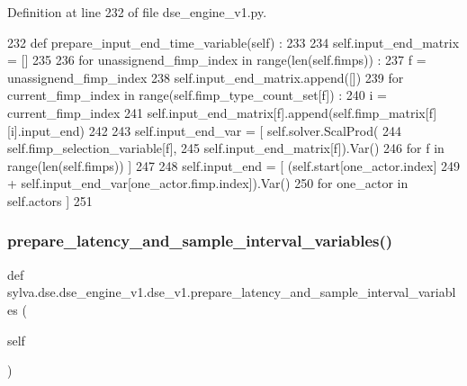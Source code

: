 Definition at line 232 of file dse\+\_\+engine\+\_\+v1.\+py.


\begin{DoxyCode}
232   \textcolor{keyword}{def }prepare\_input\_end\_time\_variable(self) :
233 
234     self.input\_end\_matrix = []
235 
236     \textcolor{keywordflow}{for} unassignend\_fimp\_index \textcolor{keywordflow}{in} range(len(self.fimps)) :
237       f = unassignend\_fimp\_index
238       self.input\_end\_matrix.append([])
239       \textcolor{keywordflow}{for} current\_fimp\_index \textcolor{keywordflow}{in} range(self.fimp\_type\_count\_set[f]) :
240         i = current\_fimp\_index
241         self.input\_end\_matrix[f].append(self.fimp\_matrix[f][i].input\_end)
242 
243     self.input\_end\_var = [ self.solver.ScalProd(
244                              self.fimp\_selection\_variable[f],
245                              self.input\_end\_matrix[f]).Var()
246                       \textcolor{keywordflow}{for} f \textcolor{keywordflow}{in} range(len(self.fimps)) ]
247 
248     self.input\_end = [ (self.start[one\_actor.index]
249                       + self.input\_end\_var[one\_actor.fimp.index]).Var()
250                         \textcolor{keywordflow}{for} one\_actor \textcolor{keywordflow}{in} self.actors ]
251 
\end{DoxyCode}
\mbox{\label{classsylva_1_1dse_1_1dse__engine__v1_1_1dse__v1_aaf4998f28b186740af869957be403635}} 
\subsubsection{\texorpdfstring{prepare\+\_\+latency\+\_\+and\+\_\+sample\+\_\+interval\+\_\+variables()}{prepare\_latency\_and\_sample\_interval\_variables()}}
{\footnotesize\ttfamily def sylva.\+dse.\+dse\+\_\+engine\+\_\+v1.\+dse\+\_\+v1.\+prepare\+\_\+latency\+\_\+and\+\_\+sample\+\_\+interval\+\_\+variables (\begin{DoxyParamCaption}\item[{}]{self }\end{DoxyParamCaption})}



